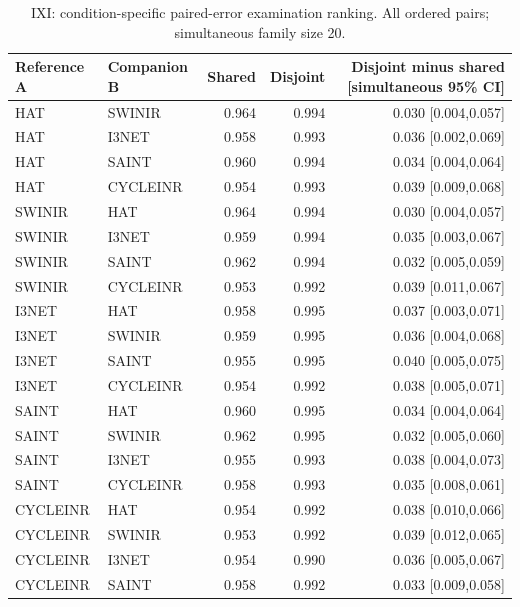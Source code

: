 \begin{table}[t]\centering\small
\caption{IXI: condition-specific paired-error examination ranking. All ordered pairs; simultaneous family size 20.}
\begin{tabular}{llrrr}\toprule Reference A & Companion B & Shared & Disjoint & Disjoint minus shared [simultaneous 95\% CI]\\\midrule
HAT & SWINIR & 0.964 & 0.994 & 0.030 [0.004,0.057] \\
HAT & I3NET & 0.958 & 0.993 & 0.036 [0.002,0.069] \\
HAT & SAINT & 0.960 & 0.994 & 0.034 [0.004,0.064] \\
HAT & CYCLEINR & 0.954 & 0.993 & 0.039 [0.009,0.068] \\
SWINIR & HAT & 0.964 & 0.994 & 0.030 [0.004,0.057] \\
SWINIR & I3NET & 0.959 & 0.994 & 0.035 [0.003,0.067] \\
SWINIR & SAINT & 0.962 & 0.994 & 0.032 [0.005,0.059] \\
SWINIR & CYCLEINR & 0.953 & 0.992 & 0.039 [0.011,0.067] \\
I3NET & HAT & 0.958 & 0.995 & 0.037 [0.003,0.071] \\
I3NET & SWINIR & 0.959 & 0.995 & 0.036 [0.004,0.068] \\
I3NET & SAINT & 0.955 & 0.995 & 0.040 [0.005,0.075] \\
I3NET & CYCLEINR & 0.954 & 0.992 & 0.038 [0.005,0.071] \\
SAINT & HAT & 0.960 & 0.995 & 0.034 [0.004,0.064] \\
SAINT & SWINIR & 0.962 & 0.995 & 0.032 [0.005,0.060] \\
SAINT & I3NET & 0.955 & 0.993 & 0.038 [0.004,0.073] \\
SAINT & CYCLEINR & 0.958 & 0.993 & 0.035 [0.008,0.061] \\
CYCLEINR & HAT & 0.954 & 0.992 & 0.038 [0.010,0.066] \\
CYCLEINR & SWINIR & 0.953 & 0.992 & 0.039 [0.012,0.065] \\
CYCLEINR & I3NET & 0.954 & 0.990 & 0.036 [0.005,0.067] \\
CYCLEINR & SAINT & 0.958 & 0.992 & 0.033 [0.009,0.058] \\
\bottomrule\end{tabular}\end{table}
